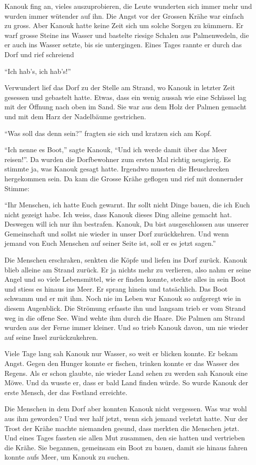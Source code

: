 Kanouk fing an, vieles auszuprobieren, die Leute wunderten sich immer mehr und wurden immer wütender auf ihn. Die Angst vor der Grossen Krähe war einfach zu gross. Aber Kanouk hatte keine Zeit sich um solche Sorgen zu kümmern. Er warf grosse Steine ins Wasser und bastelte riesige Schalen aus Palmenwedeln, die er auch ins Wasser setzte, bis sie untergingen. Eines Tages rannte er durch das Dorf und rief schreiend 

\enquote{Ich hab's, ich hab's!}

Verwundert lief das Dorf zu der Stelle am Strand, wo Kanouk in letzter Zeit gesessen und gebastelt hatte. Etwas, dass ein wenig aussah wie eine Schüssel lag mit der Öffnung nach oben im Sand. Sie war aus dem Holz der Palmen gemacht und mit dem Harz der Nadelbäume gestrichen. 

\enquote{Was soll das denn sein?} fragten sie sich und kratzen sich am Kopf. 

\enquote{Ich nenne es Boot,} sagte Kanouk, \enquote{Und ich werde damit über das Meer reisen!}. Da wurden die Dorfbewohner zum ersten Mal richtig neugierig. Es stimmte ja, was Kanouk gesagt hatte. Irgendwo mussten die Heuschrecken hergekommen sein. Da kam die Grosse Krähe geflogen und rief mit donnernder Stimme:

\enquote{Ihr Menschen, ich hatte Euch gewarnt. Ihr sollt nicht Dinge bauen, die ich Euch nicht gezeigt habe. Ich weiss, dass Kanouk dieses Ding alleine gemacht hat. Deswegen will ich nur ihn bestrafen. Kanouk, Du bist ausgeschlossen aus unserer Gemeinschaft und sollst nie wieder in unser Dorf zurückkehren. Und wenn jemand von Euch Menschen auf seiner Seite ist, soll er es jetzt sagen.}

Die Menschen erschraken, senkten die Köpfe und liefen ins Dorf zurück. Kanouk blieb alleine am Strand zurück. Er ja nichts mehr zu verlieren, also nahm er seine Angel und so viele Lebensmittel, wie er finden konnte, steckte alles in sein Boot und stiess es hinaus ins Meer. Er sprang hinein und tatsächlich. Das Boot schwamm und er mit ihm. Noch nie im Leben war Kanouk so aufgeregt wie in diesem Augenblick. Die Strömung erfasste ihn und langsam trieb er vom Strand weg in die offene See. Wind wehte ihm durch die Haare. Die Palmen am Strand wurden aus der Ferne immer kleiner. Und so trieb Kanouk davon, um nie wieder auf seine Insel zurückzukehren.

Viele Tage lang sah Kanouk nur Wasser, so weit er blicken konnte. Er bekam Angst. Gegen den Hunger konnte er fischen, trinken konnte er das Wasser des Regens. Als er schon glaubte, nie wieder Land sehen zu werden sah Kanouk eine Möwe. Und da wusste er, dass er bald Land finden würde. So wurde Kanouk der erste Mensch, der das Festland erreichte.

Die Menschen in dem Dorf aber konnten Kanouk nicht vergessen. Was war wohl aus ihm geworden? Und wer half jetzt, wenn sich jemand verletzt hatte. Nur der Trost der Krähe machte niemanden gesund, dass merkten die Menschen jetzt. Und eines Tages fassten sie allen Mut zusammen, den sie hatten und vertrieben die Krähe. Sie begannen, gemeinsam ein Boot zu bauen, damit sie hinaus fahren konnte aufs Meer, um Kanouk zu suchen. \hfill {\color{red}\decofourleft}
